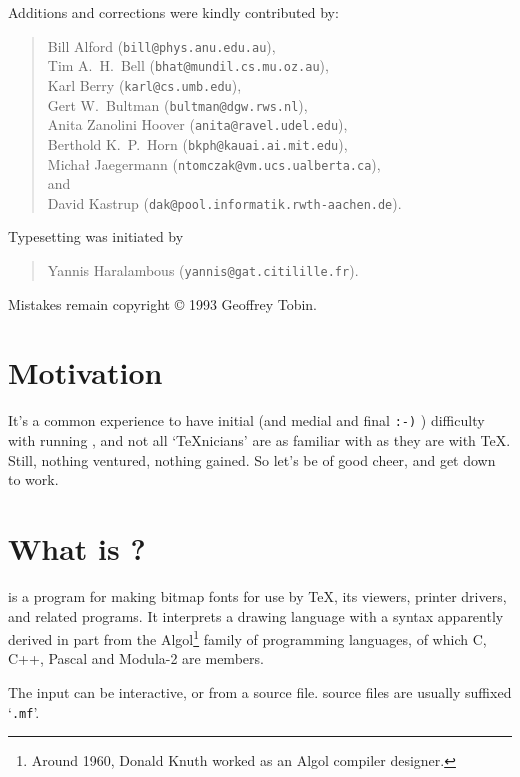 Additions and corrections were kindly contributed by:
\begin{quote}
Bill {\sc Alford} ({\tt bill@phys.anu.edu.au}),\\
Tim A.~H.~{\sc Bell} ({\tt bhat@mundil.cs.mu.oz.au}),\\
Karl {\sc Berry} ({\tt karl@cs.umb.edu}),\\
Gert W.~{\sc Bultman} ({\tt bultman@dgw.rws.nl}),\\
Anita {\sc Zanolini Hoover} ({\tt anita@ravel.udel.edu}),\\
Berthold K.~P.~{\sc Horn} ({\tt bkph@kauai.ai.mit.edu}),\\
Micha{\l} {\sc Jaegermann} ({\tt ntomczak@vm.ucs.ualberta.ca}),\\
\hspace*{4em}and\\
David {\sc Kastrup} ({\tt dak@pool.informatik.rwth-aachen.de}).
\end{quote}

Typesetting was initiated by
\begin{quote}
Yannis {\sc Haralambous} ({\tt yannis@gat.citilille.fr}).
\end{quote}

Mistakes remain copyright \copyright{} 1993 Geoffrey {\sc Tobin}.


\section*{Motivation}%

It's a common experience to have initial (and medial and final
{\tt :-)} ) difficulty with running \MF{}, and not all `\TeX{}nicians'
are as familiar with \MF{} as they are with \TeX{}.  Still, nothing
ventured, nothing gained.  So let's be of good cheer, and get down to
work.


\section{What is \MF{}?}

\MF{} is a program for making bitmap fonts for use by \TeX{},
its viewers, printer drivers, and related programs.
It interprets a drawing language
with a syntax apparently derived in part from the Algol\footnote
{Around 1960, Donald {\sc Knuth} worked as an Algol compiler
designer.}
family of programming languages, of which C, C++, Pascal and Modula-2
are members.

The input can be interactive, or from a source file.
\MF{} source files are usually suffixed `{\tt .mf}'.

